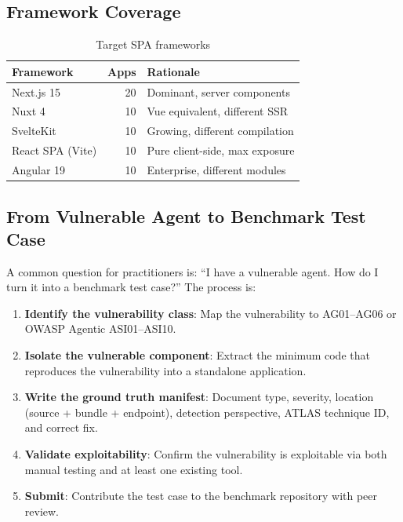 \documentclass[11pt,twocolumn]{article}
\begin{document}
\subsection{Framework Coverage}

\begin{table}[H]
\centering
\caption{Target SPA frameworks}
\label{tab:frameworks}
\scriptsize
\begin{tabular}{@{}lrl@{}}
\toprule
\textbf{Framework} & \textbf{Apps} & \textbf{Rationale} \\
\midrule
Next.js 15 & 20 & Dominant, server components \\
Nuxt 4 & 10 & Vue equivalent, different SSR \\
SvelteKit & 10 & Growing, different compilation \\
React SPA (Vite) & 10 & Pure client-side, max exposure \\
Angular 19 & 10 & Enterprise, different modules \\
\bottomrule
\end{tabular}
\end{table}

\subsection{From Vulnerable Agent to Benchmark Test Case}

A common question for practitioners is: ``I have a vulnerable agent. How do I turn it into a benchmark test case?'' The process is:

\begin{enumerate}
    \item \textbf{Identify the vulnerability class}: Map the vulnerability to AG01--AG06 or OWASP Agentic ASI01--ASI10.
    \item \textbf{Isolate the vulnerable component}: Extract the minimum code that reproduces the vulnerability into a standalone application.
    \item \textbf{Write the ground truth manifest}: Document type, severity, location (source + bundle + endpoint), detection perspective, ATLAS technique ID, and correct fix.
    \item \textbf{Validate exploitability}: Confirm the vulnerability is exploitable via both manual testing and at least one existing tool.
    \item \textbf{Submit}: Contribute the test case to the benchmark repository with peer review.
\end{enumerate}
\end{document}
